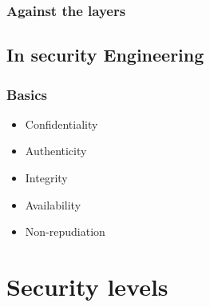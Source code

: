 \documentclass{beamer}
\begin{document}
\begin{frame}
\frametitle{Against the layers}
    \begin{figure}[h]
    \end{figure}
\end{frame}

\subsection{In security Engineering}

\begin{frame}
\frametitle{Basics}
    \begin{itemize}
        \item Confidentiality
        \item Authenticity
        \item Integrity
        \item Availability
        \item Non-repudiation
    \end{itemize}
\end{frame}

\section{Security levels}
\end{document}
